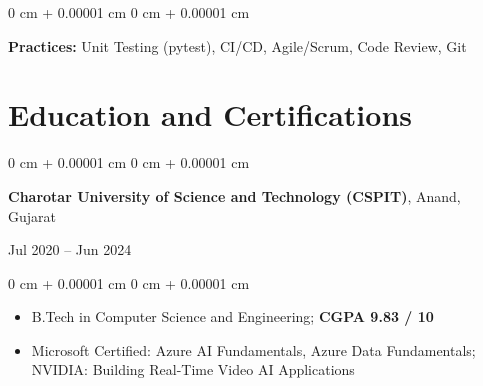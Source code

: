 \documentclass[10pt, letterpaper]{article}
\newenvironment{highlights}{
    \begin{itemize}[
        topsep=0.06 cm,
        parsep=0.06 cm,
        partopsep=0pt,
        itemsep=0pt,
        leftmargin=0 cm + 10pt
    ]
}{
    \end{itemize}
} %
\newenvironment{onecolentry}{
    \begin{adjustwidth}{
        0 cm + 0.00001 cm
    }{
        0 cm + 0.00001 cm
    }
}{
    \end{adjustwidth}
} %
\newenvironment{twocolentry}[2][]{
    \onecolentry
    \def\secondColumn{#2}
}{
    \unskip\hfill\secondColumn
    \endonecolentry
} %
\begin{document}
        \begin{onecolentry}
            \textbf{Practices:} Unit Testing (pytest), CI/CD, Agile/Scrum, Code Review, Git
        \end{onecolentry}

    \section{Education and Certifications}

        \begin{twocolentry}{Jul 2020 – Jun 2024}
            \textbf{Charotar University of Science and Technology (CSPIT)}, Anand, Gujarat
        \end{twocolentry}

        \vspace{0.06 cm}
        \begin{onecolentry}
            \begin{highlights}
                \item B.Tech in Computer Science and Engineering; \textbf{CGPA 9.83 / 10}
                \item Microsoft Certified: Azure AI Fundamentals, Azure Data Fundamentals; NVIDIA: Building Real-Time Video AI Applications
            \end{highlights}
        \end{onecolentry}
\end{document}
